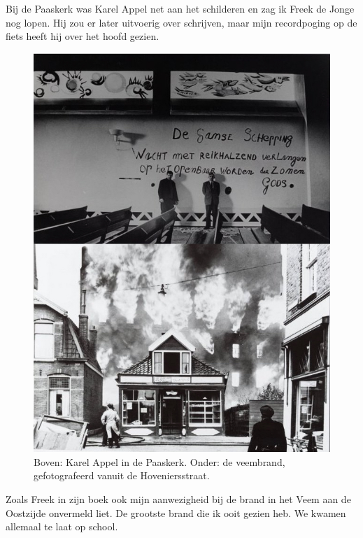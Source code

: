 \documentclass[12pt,twoside, openright]{memoir}
\begin{document}
Bij de Paaskerk was Karel Appel net aan het schilderen en zag ik Freek de Jonge nog lopen. Hij zou er later uitvoerig over schrijven, maar mijn recordpoging op de fiets heeft hij over het hoofd gezien. 

\begin{figure}
\centering
\includegraphics[width=\textwidth]{img/81paaskerkveembrand}
\caption*{\footnotesize Boven: Karel Appel in de Paaskerk. Onder: de veembrand, gefotografeerd vanuit de Hoveniersstraat.}
\end{figure}


Zoals Freek in zijn boek ook mijn aanwezigheid bij de brand in het Veem aan de Oostzijde onvermeld liet. De grootste brand die ik ooit gezien heb. We kwamen allemaal te laat op school. 
\end{document}
